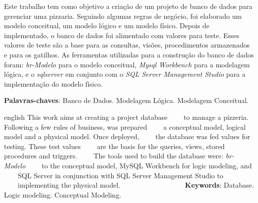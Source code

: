 \documentclass[
	12pt,				%
	openright,			%
	oneside,			%
	a4paper,			%
	chapter=TITLE,		%
	section=TITLE,		%
	english,			%
	brazil				%
	]{abntex2}
\begin{document}


\setlength{\absparsep}{18pt} %
\begin{resumo}
    Este trabalho tem como objetivo a criação de um projeto de banco de dados 
    para gerenciar uma pizzaria. Seguindo algumas regras de negócio, foi elaborado 
    um modelo conceitual, um modelo lógico e um modelo físico. Depois de implementado, 
    o banco de dados foi alimentado com valores para teste. Esses valores de teste 
    são a base para as consultas, visões, procedimentos armazenados e para os gatilhos.
    As ferramentas utilizadas para a construção do banco de dados foram: \textit{br-Modelo
    \cite{brmodelo}} 
    para o modelo conceitual, \textit{Mysql Workbench \cite{mysql-workbench}} para a 
    modelagem lógica, e o \textit{sqlserver \cite{sqlserver}} em conjunto com o \textit{SQL Server 
    Management Studio} para a implementação do modelo físico.
    
    \noindent
    
    \textbf{Palavras-chaves}: Banco de Dados. Modelagem Lógica. Modelagem Conceitual.
\end{resumo}

\begin{resumo}[Abstract]
 \begin{otherlanguage*}{english}
    This work aims at creating a project database
    to manage a pizzeria. Following a few rules of business, was prepared
    a conceptual model, logical model and a physical model. Once deployed,
    the database was fed values ​​for testing. These test values
    are the basis for the queries, views, stored procedures and triggers.
    The tools used to build the database were: \textit{br-Modelo}
    to the conceptual model, MySQL Workbench for logic modeling, and
    SQL Server in conjunction with SQL Server Management Studio to
    implementing the physical model.
    
    \noindent    
     \textbf {Keywords}: Database. Logic modeling. Conceptual Modeling.
   \vspace{\onelineskip}
 \end{otherlanguage*}
\end{resumo}

\listoffigures*
\cleardoublepage
\end{document}
